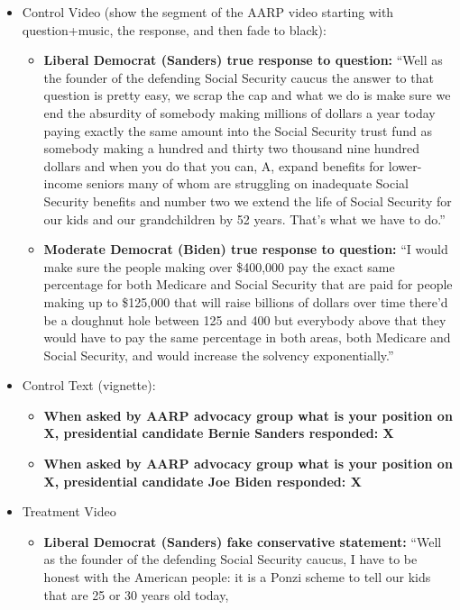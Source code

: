 \begin{itemize}
\item Control Video (show the segment of the AARP video starting with
  question+music, the response, and then fade to black):
  \begin{itemize}
  \item \textbf{Liberal Democrat (Sanders) true response to question:}
    ``Well as the founder of the defending Social Security caucus the
    answer to that question is pretty easy, we scrap the cap and what
    we do is make sure we end the absurdity of somebody making
    millions of dollars a year today paying exactly the same amount
    into the Social Security trust fund as somebody making a hundred
    and thirty two thousand nine hundred dollars and when you do that
    you can, A, expand benefits for lower-income seniors many of whom
    are struggling on inadequate Social Security benefits and number
    two we extend the life of Social Security for our kids and our
    grandchildren by 52 years. That's what we have to do.''
  \item \textbf{Moderate Democrat (Biden) true response to question:}
    ``I would make sure the people making over \$400,000 pay the exact
    same percentage for both Medicare and Social Security that are
    paid for people making up to \$125,000 that will raise billions of
    dollars over time there'd be a doughnut hole between 125 and 400
    but everybody above that they would have to pay the same
    percentage in both areas, both Medicare and Social Security, and
    would increase the solvency exponentially.''
  \end{itemize}
\item Control Text (vignette):
  \begin{itemize}
  \item \textbf{When asked by AARP advocacy group what is your position on X, presidential candidate Bernie Sanders responded: X}
  \item \textbf{When asked by AARP advocacy group what is your position on X, presidential candidate Joe Biden responded: X}
  \end{itemize}
\item Treatment Video
  \begin{itemize}
  \item \textbf{Liberal Democrat (Sanders) fake conservative
    statement:} ``Well as the founder of the defending Social Security
    caucus, I have to be honest with the American people: it is a
    Ponzi scheme to tell our kids that are 25 or 30 years old today,

\end{itemize}
\end{itemize}
